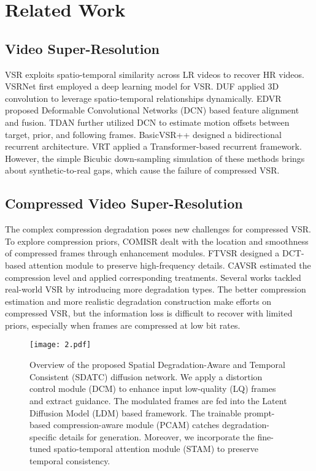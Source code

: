 \section{Related Work}
\subsection{Video Super-Resolution}
VSR exploits spatio-temporal similarity across LR videos to recover HR videos. %
VSRNet \cite{VSRnet} first employed a deep learning model for VSR. DUF \cite{DUF} applied 3D convolution to leverage spatio-temporal relationships dynamically. EDVR \cite{EDVR} proposed Deformable Convolutional Networks (DCN) \cite{DCN} based feature alignment and fusion. TDAN \cite{TDAN} further utilized DCN to estimate motion offsets between target, prior, and following frames. BasicVSR++ \cite{BasicVSR++} designed a bidirectional recurrent architecture. VRT \cite{VRT} applied a Transformer-based recurrent framework. However, the simple Bicubic down-sampling simulation of these methods brings about synthetic-to-real gaps, which cause the failure of compressed VSR.

\subsection{Compressed Video Super-Resolution}
The complex compression degradation poses new challenges for compressed VSR. To explore compression priors, COMISR \cite{COMISR} dealt with the location and smoothness of compressed frames through enhancement modules. FTVSR \cite{FTVSR} designed a DCT-based attention module to preserve high-frequency details. CAVSR \cite{CAVSR} estimated the compression level and applied corresponding treatments. Several works \cite{RealVSR,RealESRGAN,RealBasicVSR} tackled real-world VSR by introducing more degradation types. The better compression estimation and more realistic degradation construction make efforts on compressed VSR, but the information loss is difficult to recover with limited priors, especially when frames are compressed at low bit rates.

\begin{figure*}[!t]
\centering
\texttt{[image: 2.pdf]}
\setlength{\belowcaptionskip}{-8pt}
\caption{Overview of the proposed Spatial Degradation-Aware and Temporal Consistent (SDATC) diffusion network. We apply a distortion control module (DCM) to enhance input low-quality (LQ) frames and extract guidance. The modulated frames are fed into the Latent Diffusion Model (LDM) based framework. The trainable prompt-based compression-aware module (PCAM) catches degradation-specific details for generation. Moreover, we incorporate the fine-tuned spatio-temporal attention module (STAM) to preserve temporal consistency.}
\label{fig_2}
\end{figure*}

